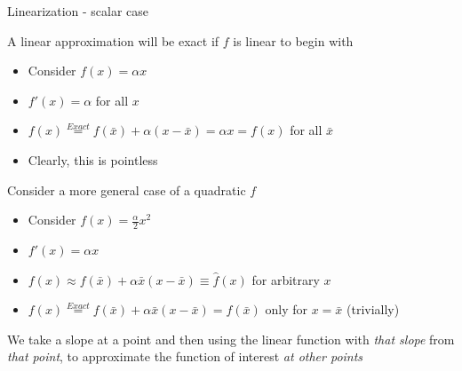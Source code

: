 \begin{frame}{Linearization - scalar case}

A linear approximation will be exact if $f$ is linear to begin with
\begin{itemize}
\item	Consider $f(x) = \alpha x$
\item	$f'(x) = \alpha$ for all $x$
\item	$f(x) \stackrel{Exact}= f(\bar{x}) +  \alpha (x-\bar{x}) = \alpha x = f(x)$ for all $\bar{x}$
\item	Clearly, this is pointless
\end{itemize}

\vspace{2mm}
Consider a more general case of a quadratic $f$
\begin{itemize}
\item	Consider $f(x) = \frac{\alpha}{2} x^{2}$
\item	$f'(x) = \alpha x$
\item	$f(x) \approx f(\bar{x}) +  \alpha \bar{x} (x-\bar{x}) \equiv \hat{f}(x)$ for arbitrary $x$
\item	$f(x) \stackrel{Exact}= f(\bar{x}) +  \alpha \bar{x} (x-\bar{x}) = f(\bar{x})$ only for $x=\bar{x}$ (trivially)
\end{itemize}

\vspace{2mm}
We take a slope at a point and then using the linear function with \emph{that slope} from \emph{that point}, to approximate the function of interest \emph{at other points}

\end{frame}



